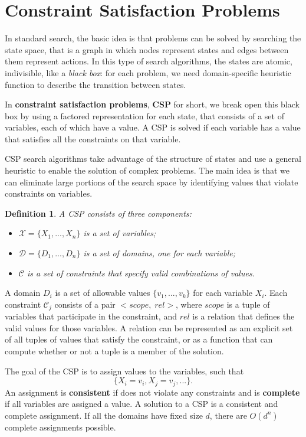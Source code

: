 \documentclass{article}
\newtheorem{definition}{Definition}
\begin{document}
\newpage
\section{Constraint Satisfaction Problems}
In standard search, the basic idea is that problems can be solved by searching the state space, that is a graph in which nodes represent states and edges between them represent actions. In this type of search algorithms, the states are atomic, indivisible, like a \textit{black box}: for each problem, we need domain-specific heuristic function to describe the transition between states.

In \textbf{constraint satisfaction problems}, \textbf{CSP} for short, we break open this black box by using a factored representation for each state, that consists of a set of variables, each of which have a value. A CSP is solved if each variable has a value that satisfies all the constraints on that variable.

CSP search algorithms take advantage of the structure of states and use a general heuristic to enable the solution of complex problems. The main idea is that we can eliminate large portions of the search space by identifying values that violate constraints on variables.  \\

\begin{definition}
A CSP consists of three components:
\begin{itemize}
    \item \(\mathcal{X} =\{X_1, ..., X_n\}\) is a set of variables;
    \item \(\mathcal{D} =\{D_1, ..., D_n\}\) is a set of domains, one for each variable;
    \item \(\mathcal{C}\) is a set of constraints that specify valid combinations of values.
\end{itemize}
\end{definition}

A domain \(D_i\) is a set of allowable values \(\{v_1, ..., v_k\}\) for each variable \(X_i\). Each constraint \(\mathcal{C}_j\) consists of a pair \(<scope,\; rel>\), where \(scope\) is a tuple of variables that participate in the constraint, and \(rel\) is a relation that defines the valid values for those variables. A relation can be represented as am explicit set of all tuples of values that satisfy the constraint, or as a function that can compute whether or not a tuple is a member of the solution.

The goal of the CSP is to assign values to the variables, such that 
\[\{X_i=v_i, X_j=v_j, ...\}.\] 
An assignment is \textbf{consistent} if does not violate any constraints and is \textbf{complete} if all variables are assigned a value. A solution to a CSP is a consistent and complete assignment. If all the domains have fixed size \(d\), there are \(O(d^n)\) complete assignments possible.
\end{document}
